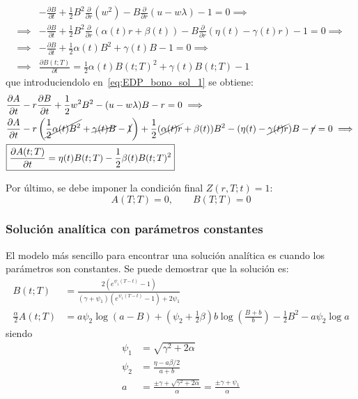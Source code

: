 \begin{align*}
    &-\frac{\partial B}{\partial t} + \frac{1}{2} B^2 \frac{\partial}{\partial r}\left(w^2\right) - B \frac{\partial}{\partial r} (u - w\lambda) - 1 = 0 \implies \\
    \implies &-\frac{\partial B}{\partial t} + \frac{1}{2} B^2 \frac{\partial}{\partial r}\left(\alpha(t) r + \beta(t)\right) - B \frac{\partial}{\partial r} (\eta(t) - \gamma(t) r) - 1 = 0 \implies \\
    \implies &-\frac{\partial B}{\partial t} + \frac{1}{2} \alpha(t) B^2 + \gamma(t) B - 1 = 0 \implies \\
    \implies &\boxed{\frac{\partial B(t;T)}{\partial t} = \frac{1}{2} \alpha(t) B(t;T)^2 + \gamma(t) B(t;T) - 1}
\end{align*}
que introduciendolo en~\eqref{eq:EDP_bono_sol_1} se obtiene:
\begin{align*}
    &\frac{\partial A}{\partial t} - r \frac{\partial B}{\partial t} + \frac{1}{2} w^2 B^2 - (u - w\lambda) B - r = 0 \implies \\
    &\frac{\partial A}{\partial t} - r \left(\cancel{\frac{1}{2} \alpha(t) B^2} + \cancel{\gamma(t) B} - \cancel{1}\right) + \frac{1}{2} (\cancel{\alpha(t) r} + \beta(t)) B^2 - (\eta(t) - \cancel{\gamma(t) r}) B - \cancel{r} = 0 \implies \\
    &\boxed{\frac{\partial A(t;T)}{\partial t} = \eta(t) B(t;T) - \frac{1}{2} \beta(t) B(t;T)^2} \\
\end{align*}

Por último, se debe imponer la condición final $Z(r,T;t)=1$:
\begin{equation*}
    \boxed{A(T;T) = 0, \qquad B(T;T) = 0}
\end{equation*}





\subsubsection{Solución analítica con parámetros constantes}
El modelo más sencillo para encontrar una solución analítica es cuando los parámetros son constantes. Se puede demostrar que la solución es:
\begin{equation*}
    \boxed{
        \begin{aligned}
            B(t;T) &= \frac{2\left(e^{\psi_1 (T-t)} - 1\right)}{(\gamma + \psi_1)\left(e^{\psi_1 (T-t)} - 1\right) + 2\psi_1} \\[1.5em]
            \frac{\alpha}{2}A(t;T) &= a\psi_2 \log(a - B) + (\psi_2 + \tfrac{1}{2}\beta)b \log\left(\frac{B + b}{b}\right) - \tfrac{1}{2}B^2 - a\psi_2 \log a
        \end{aligned}
    }
\end{equation*}
siendo
\begin{align*}
    \psi_1 &= \sqrt{\gamma^2 + 2\alpha} \\
    \psi_2 &= \frac{\eta - a\beta/2}{a + b} \\
    a &= \frac{\pm\gamma + \sqrt{\gamma^2 + 2\alpha}}{\alpha} = \frac{\pm\gamma + \psi_1}{\alpha} \\
\end{align*}

